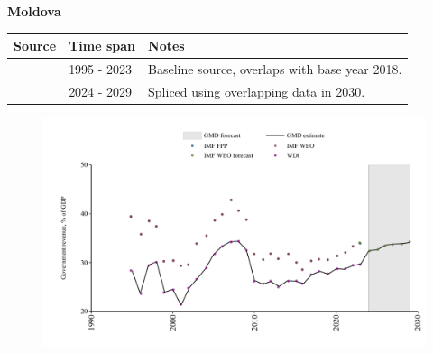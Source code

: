 \documentclass[12pt,a4paper,landscape]{article}
\begin{document}
\begin{adjustbox}{max totalsize={\paperwidth}{\paperheight},center}
\begin{minipage}[t][\textheight][t]{\textwidth}
\vspace*{0.5cm}
{}
\begin{center}
{\Large\bfseries Moldova}
\end{center}
\vspace{0.5cm}
\begin{table}[H]
\centering
\small
\begin{tabular}{|l|l|l|}
\hline
\textbf{Source} & \textbf{Time span} & \textbf{Notes} \\
\hline
\rowcolor{white}\cite{WDI}& 1995 - 2023 &Baseline source, overlaps with base year 2018.\\
\rowcolor{lightgray}\cite{IMF_WEO_forecast}& 2024 - 2029 &Spliced using overlapping data in 2030.\\
\hline
\end{tabular}
\end{table}
\begin{figure}[H]
\centering
\includegraphics[width=\textwidth,height=0.6\textheight,keepaspectratio]{graphs/MDA_govrev_GDP.pdf}
\end{figure}
\end{minipage}
\end{adjustbox}
\end{document}
